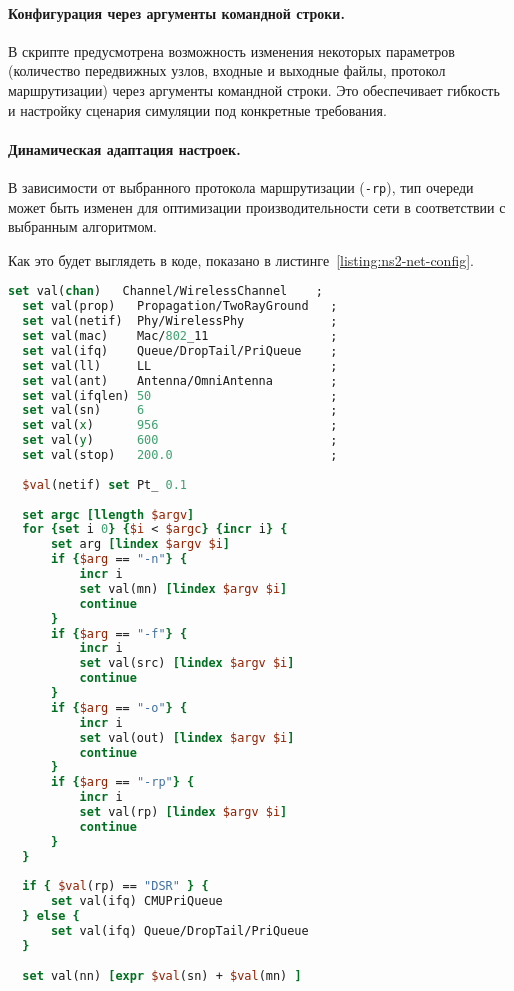 \paragraph{Конфигурация через аргументы командной строки.} В скрипте предусмотрена возможность изменения некоторых параметров (количество передвижных узлов, входные и выходные файлы, протокол маршрутизации) через аргументы командной строки. Это обеспечивает гибкость и настройку сценария симуляции под конкретные требования.

\paragraph{Динамическая адаптация настроек.} В зависимости от выбранного протокола маршрутизации (\verb|-rp|), тип очереди может быть изменен для оптимизации производительности сети в соответствии с выбранным алгоритмом.

Как это будет выглядеть в коде, показано в листинге~\ref{listing:ns2-net-config}.

\begin{lstlisting}[language=tcl, style=mystyle, caption=Конфигурация сети в NS-2, label=listing:ns2-net-config]
  set val(chan)   Channel/WirelessChannel    ;
  set val(prop)   Propagation/TwoRayGround   ;
  set val(netif)  Phy/WirelessPhy            ;
  set val(mac)    Mac/802_11                 ;
  set val(ifq)    Queue/DropTail/PriQueue    ;
  set val(ll)     LL                         ;
  set val(ant)    Antenna/OmniAntenna        ;
  set val(ifqlen) 50                         ;
  set val(sn)     6                          ;
  set val(x)      956                        ;
  set val(y)      600                        ;
  set val(stop)   200.0                      ;
  
  $val(netif) set Pt_ 0.1
  
  set argc [llength $argv]
  for {set i 0} {$i < $argc} {incr i} {
      set arg [lindex $argv $i]
      if {$arg == "-n"} {
          incr i
          set val(mn) [lindex $argv $i]
          continue
      }
      if {$arg == "-f"} {
          incr i
          set val(src) [lindex $argv $i]
          continue
      }
      if {$arg == "-o"} {
          incr i
          set val(out) [lindex $argv $i]
          continue
      }
      if {$arg == "-rp"} {
          incr i
          set val(rp) [lindex $argv $i]
          continue
      }
  }
  
  if { $val(rp) == "DSR" } {
      set val(ifq) CMUPriQueue
  } else {
      set val(ifq) Queue/DropTail/PriQueue
  }
  
  set val(nn) [expr $val(sn) + $val(mn) ]
\end{lstlisting}
  
